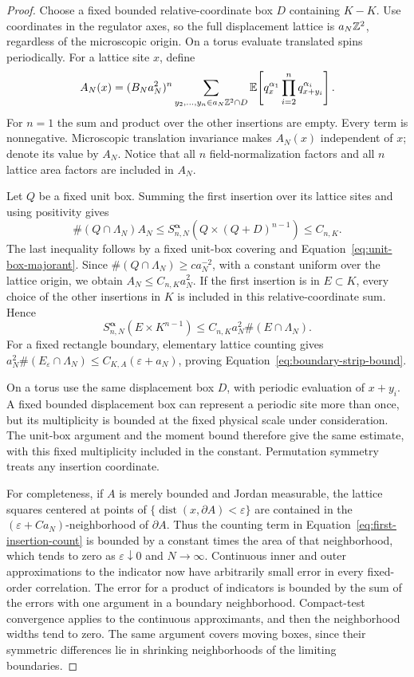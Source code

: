 \begin{proof}
Choose a fixed bounded relative-coordinate box $D$ containing $K-K$.
Use coordinates in the regulator axes, so the full displacement lattice
is $a_N\mathbb Z^2$, regardless of the microscopic origin.  On a torus evaluate
translated spins periodically.  For a lattice site $x$, define
\[
 A_N(x)=(B_Na_N^2)^n
     \sum_{y_2,\ldots,y_n\in a_N\mathbb Z^2\cap D}
       \mathbb E\!\left[q_x^{\alpha_1}
                    \prod_{i=2}^n q_{x+y_i}^{\alpha_i}\right].
\]
For $n=1$ the sum and product over the other insertions are empty.
Every term is nonnegative.  Microscopic translation invariance makes
$A_N(x)$ independent of $x$; denote its value by $A_N$.  Notice that
all $n$ field-normalization factors and all $n$ lattice area factors
are included in $A_N$.

Let $Q$ be a fixed unit box.  Summing the first insertion over its
lattice sites and using positivity gives
\[
  \#(Q\cap\Lambda_N) A_N
     \le S_{n,N}^{\boldsymbol\alpha}
                  (Q\times(Q+D)^{n-1})
     \le C_{n,K}.
\]
The last inequality follows by a fixed unit-box covering and
Equation~\eqref{eq:unit-box-majorant}.  Since
$\#(Q\cap\Lambda_N)\ge c a_N^{-2}$, with a constant uniform over the
lattice origin, we obtain $A_N\le C_{n,K}a_N^2$.  If the first insertion
is in $E\subset K$, every choice of the other insertions in $K$ is
included in this relative-coordinate sum.  Hence
\begin{equation}
 S_{n,N}^{\boldsymbol\alpha}(E\times K^{n-1})
       \le C_{n,K}a_N^2\#(E\cap\Lambda_N).
 \label{eq:first-insertion-count}
\end{equation}
For a fixed rectangle boundary, elementary lattice counting gives
$a_N^2\#(E_\varepsilon\cap\Lambda_N)
 \le C_{K,A}(\varepsilon+a_N)$, proving
Equation~\eqref{eq:boundary-strip-bound}.

On a torus use the same displacement box $D$, with periodic evaluation
of $x+y_i$.  A fixed bounded displacement box can represent a periodic
site more than once, but its multiplicity is bounded at the fixed
physical scale under consideration.  The unit-box argument and the
moment bound therefore give the same estimate, with this fixed
multiplicity included in the constant.  Permutation symmetry treats
any insertion coordinate.

For completeness, if $A$ is merely bounded and Jordan measurable,
the lattice squares centered at points of
$\{\operatorname{dist}(x,\partial A)<\varepsilon\}$ are contained in the
$(\varepsilon+Ca_N)$-neighborhood of $\partial A$.  Thus the counting
term in Equation~\eqref{eq:first-insertion-count} is bounded by a
constant times the area of that neighborhood, which tends to zero as
$\varepsilon\downarrow0$ and $N\to\infty$.  Continuous inner and outer
approximations to the indicator now have arbitrarily small error in
every fixed-order correlation.  The error for a product of indicators
is bounded by the sum of the errors with one argument in a boundary
neighborhood.  Compact-test convergence applies to the continuous
approximants, and then the neighborhood widths tend to zero.  The same
argument covers moving boxes, since their symmetric differences lie
in shrinking neighborhoods of the limiting boundaries.
\end{proof}
